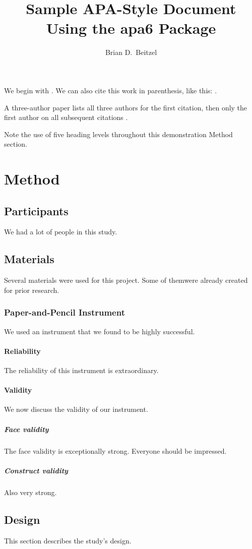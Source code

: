 \documentclass[jou]{apa6}
\title{Sample APA-Style Document Using the \textsf{apa6} Package}
\author{Brian D.\ Beitzel}
\affiliation{SUNY Oneonta}
\begin{document}
	\maketitle
	We begin with \textcite{Shotton1989}.  We can also cite this work in
	parenthesis, like this: \parencite{Shotton1989}.
	
	A three-author paper \parencite[e.g.,][]{Lassen2006} lists all
	three authors for the first citation, then only the first author
	on all subsequent citations \parencite{Lassen2006}.
	
	Note the use of five heading levels throughout this demonstration
	Method section.
	
	\section{Method}
	\subsection{Participants}
	We had a lot of people in this study.
	
	\subsection{Materials}
	Several materials were used for this project.  Some of themwere
	already created for prior research.
	
	\subsubsection{Paper-and-Pencil Instrument}
	We used an instrument that we found to be highly successful.
	
	\paragraph{Reliability}
	The reliability of this instrument is extraordinary.
	
	\paragraph{Validity}
	We now discuss the validity of our instrument.
	
	\subparagraph{Face validity} The face validity is exceptionally
	strong.  Everyone should be impressed.
	
	\subparagraph{Construct validity} Also very strong.
	
	\subsection{Design}
	This section describes the study's design.
	
\end{document}
